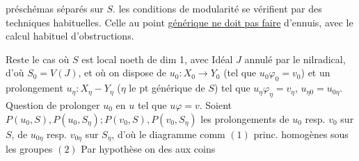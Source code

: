 préschémas   séparés sur $S$.  les  conditions de modularité se vérifient par des techniques habituelles.  Celle au point \uline{générique ne doit pas faire} d'ennuis, avec le calcul habituel d'obstructions.

Reste le cas où $S$ est local noeth  de dim 1, avec Idéal $J$ annulé par le nilradical, d'où $S_0=V(J)$, et où on dispose de $u_0:X_0\longrightarrow Y_0$ (tel que $u_0\varphi_0=v_0$) et un prolongement $u_\eta:X_\eta-Y_\eta$ ($\eta$ le pt générique de $S$) tel que $u_\eta\varphi_\eta=v_\eta$, $u_{\eta0}=u_{0\eta}$. Question de prolonger $u_0$ en $u$ tel que $u\varphi=v$.  Soient $P(u_0,S),P(u_0,S_\eta);P(v_0,S),P(v_0,S_\eta)$ les prolongements de $u_0$ resp. $v_0$ sur $S$,  de $u_{0\eta}$ resp. $v_{0\eta}$ sur $S_\eta$, d'où le diagramme comm
 $(1)$
  princ. homogènes sous les groupes
 $(2)$
Par hypothèse on  des  aux coins
